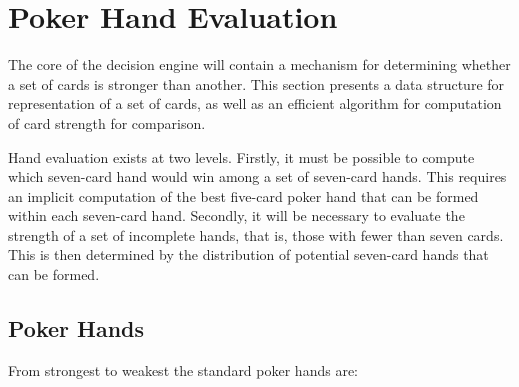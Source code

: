 
\newcommand{\xs}{$\spadesuit$}
\newcommand{\xh}{$\heartsuit$}
\newcommand{\xc}{$\clubsuit$}
\newcommand{\xd}{$\diamondsuit$}



\clearpage


\chapter{Poker Hand Evaluation}
\label{sec:HandEvaluation}

The core of the decision engine will contain a mechanism for determining whether a set of cards is stronger than another.
This section presents a data structure for representation of a set of cards, as well as an efficient algorithm for computation of card strength for comparison.





Hand evaluation exists at two levels.
Firstly, it must be possible to compute which seven-card hand would win among a set of seven-card hands.
This requires an implicit computation of the best five-card poker hand that can be formed within each seven-card hand.
Secondly, it will be necessary to evaluate the strength of a set of incomplete hands, that is, those with fewer than seven cards.
This is then determined by the distribution of potential seven-card hands that can be formed.


\section{Poker Hands}
\label{sec:PokerHands}


From strongest to weakest the standard poker hands are:

